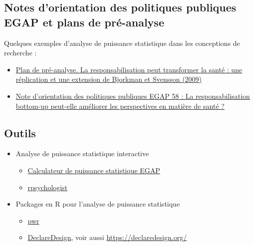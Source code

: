 \documentclass[
  12pt,
]{book}
\begin{document}
\hypertarget{notes-dorientation-des-politiques-publiques-egap-et-plans-de-pruxe9-analyse}{%
\subsection{Notes d'orientation des politiques publiques EGAP et plans de pré-analyse}\label{notes-dorientation-des-politiques-publiques-egap-et-plans-de-pruxe9-analyse}}

Quelques exemples d'analyse de puissance statistique dans les conceptions de recherche :

\begin{itemize}
\item
  \href{https://osf.io/qxwmu/}{Plan de pré-analyse. La responsabilisation peut transformer la santé : une réplication et une extension de Bjorkman et Svensson (2009)}
\item
  \href{https://egap.org/resource/does-bottom-up-accountability-work-evidence-from-uganda/}{Note d'orientation des politiques publiques EGAP 58 : La responsabilisation bottom-up peut-elle améliorer les perspectives en matière de santé ?}
\end{itemize}

\hypertarget{outils-3}{%
\subsection{Outils}\label{outils-3}}

\begin{itemize}
\item
  Analyse de puissance statistique interactive

  \begin{itemize}
  \item
    \href{https://egap.shinyapps.io/power-app/}{Calculateur de puissance statistique EGAP}
  \item
    \href{https://rpsychologist.com/d3/NHST/}{rpsychologist}
  \end{itemize}
\item
  Packages en R pour l'analyse de puissance statistique

  \begin{itemize}
  \item
    \href{https://cran.r-project.org/web/packages/pwr/index.html}{pwr}
  \item
    \href{https://cran.r-project.org/web/packages/DeclareDesign/index.html}{DeclareDesign}, voir aussi \url{https://declaredesign.org/}
  \end{itemize}
\end{itemize}
\end{document}
